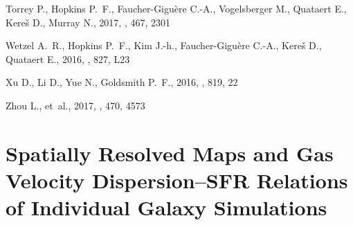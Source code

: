 \documentclass[usletter,fleqn,usenatbib]{mnras}
\begin{document}
\begin{thebibliography}{}
Torrey P.,  Hopkins P.~F.,  Faucher-Gigu{\`{e}}re C.-A.,  Vogelsberger M.,
  Quataert E.,  Kere{\v{s}} D.,   Murray N.,  2017, , 467, 2301

Wetzel A.~R.,  Hopkins P.~F.,  Kim J.-h.,  Faucher-Gigu{\`{e}}re C.-A.,
  Kere{\v{s}} D.,   Quataert E.,  2016, , 827, L23

Xu D.,  Li D.,  Yue N.,   Goldsmith P.~F.,  2016, , 819, 22

Zhou L.,  et~al., 2017, , 470, 4573

\makeatother
\end{thebibliography}
  






\appendix
\section{Spatially Resolved Maps and Gas Velocity Dispersion--SFR Relations of Individual Galaxy Simulations}\label{sec:appendix}
\end{document}
